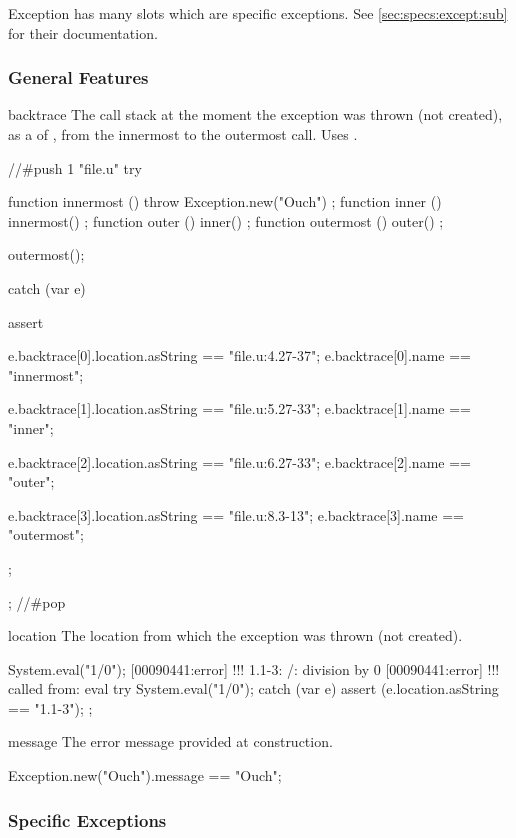 Exception has many slots which are specific exceptions.  See
\autoref{sec:specs:except:sub} for their documentation.

\subsubsection{General Features}
\begin{urbiscriptapi}
\item[backtrace] The call stack at the moment the exception was thrown (not
  created), as a  of , from the
  innermost to the outermost call.  Uses .
\begin{urbiscript}
//#push 1 "file.u"
try
{
  function innermost () { throw Exception.new("Ouch") };
  function inner     () { innermost() };
  function outer     () { inner() };
  function outermost () { outer() };

  outermost();
}
catch (var e)
{
  assert
  {
    e.backtrace[0].location.asString == "file.u:4.27-37";
    e.backtrace[0].name == "innermost";

    e.backtrace[1].location.asString == "file.u:5.27-33";
    e.backtrace[1].name == "inner";

    e.backtrace[2].location.asString == "file.u:6.27-33";
    e.backtrace[2].name == "outer";

    e.backtrace[3].location.asString == "file.u:8.3-13";
    e.backtrace[3].name == "outermost";
  };
};
//#pop
\end{urbiscript}


\item[location] The location from which the exception was thrown (not
  created).
\begin{urbiscript}
System.eval("1/0");
[00090441:error] !!! 1.1-3: /: division by 0
[00090441:error] !!!    called from: eval
try
{
  System.eval("1/0");
}
catch (var e)
{
  assert (e.location.asString == "1.1-3");
};
\end{urbiscript}


\item[message] The error message provided at construction.
\begin{urbiassert}
Exception.new("Ouch").message == "Ouch";
\end{urbiassert}
\end{urbiscriptapi}

\subsubsection{Specific Exceptions}
\label{sec:specs:except:sub}

